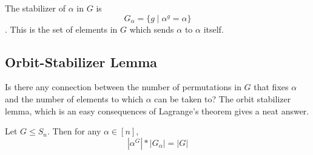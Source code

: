 The stabilizer of $\alpha$ in $G$ is $$G_{\alpha} = \{g \mid \alpha^g = \alpha\}$$. This is the set of elements in $G$ which sends $\alpha$ to $\alpha$ itself. 

\subsection{Orbit-Stabilizer Lemma}

Is there any connection between the number of permutations in $G$ that fixes $\alpha$ and the number of elements to which $\alpha$ can be taken to? The orbit stabilizer lemma, which is an easy consequences of Lagrange's theorem gives a neat answer.

\begin{lemma}
Let $G\leq S_n$. Then for any $\alpha \in [n]$,
$$|\alpha^G|*|G_{\alpha}| = |G|$$ \label{lem:os}
\end{lemma}
